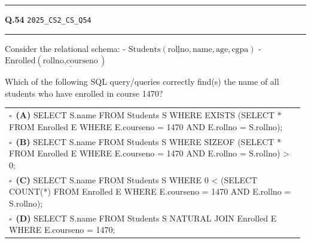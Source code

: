 \documentclass[a4paper,10pt]{article}
\begin{document}
\vspace{6pt}\hrule height 0.35pt\vspace{6pt}
\noindent
\begin{tcolorbox}[
    blanker,
    sidebyside,
    sidebyside align=top,
    lefthand width=0.55\textwidth,
    top=4pt, bottom=4pt, left=0pt, right=0pt,
    middle=16pt,
    underlay={
        \draw[dashed, black!80, line width=0.8pt, dash pattern=on 4pt off 3pt]
            ([xshift=0.55\textwidth+8pt]frame.north west) --
            ([xshift=0.55\textwidth+8pt]frame.south west);
    }
]
\textbf{Q.54}  \hfill {\tiny\texttt{2025\_CS2\_CS\_Q54}}
\vspace{2pt}\hrule height 0.3pt\vspace{4pt}

Consider the relational schema:
- $\text{Students}(\underline{\text{rollno}}, \text{name}, \text{age}, \text{cgpa})$
- $\text{Enrolled}(\underline{\text{rollno}, \text{courseno}})$
\par\medskip
Which of the following SQL query/queries correctly find(s) the name of all students who have enrolled in course 1470?

\par\vspace{6pt}\noindent
\begin{tabular}{@{}p{0.98\linewidth}@{}}
$\square$\ \textbf{(A)} SELECT S.name \newline FROM Students S \newline WHERE EXISTS (SELECT * FROM Enrolled E WHERE E.courseno = 1470 AND E.rollno = S.rollno); \\
\addlinespace[3pt]
$\square$\ \textbf{(B)} SELECT S.name \newline FROM Students S \newline WHERE SIZEOF (SELECT * FROM Enrolled E WHERE E.courseno = 1470 AND E.rollno = S.rollno) > 0; \\
\addlinespace[3pt]
$\square$\ \textbf{(C)} SELECT S.name \newline FROM Students S \newline WHERE 0 < (SELECT COUNT(*) FROM Enrolled E WHERE E.courseno = 1470 AND E.rollno = S.rollno); \\
\addlinespace[3pt]
$\square$\ \textbf{(D)} SELECT S.name \newline FROM Students S NATURAL JOIN Enrolled E \newline WHERE E.courseno = 1470;
\end{tabular}


\end{tcolorbox}
\end{document}
